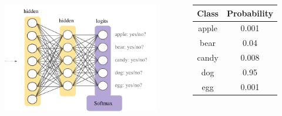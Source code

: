 \begin{frame}
\begin{columns}
		\begin{figure}[!htbp]
			\centering
			\includegraphics[width=1.0\linewidth]{images/supervised/z_algorithms_neural_networks/SoftmaxLayer.pdf}
		\end{figure}

		\begin{scriptsize}
			\begin{table}[]
				\begin{tabular}{|c|c|}
				\hline
				\rowcolor{gray!50} \textbf{Class} & \textbf{Probability}\\ \hline
				apple & 0.001\\ \hline
				bear & 0.04\\ \hline
				candy & 0.008\\ \hline
				dog & 0.95\\ \hline
				egg & 0.001\\ \hline
				\end{tabular}
			\end{table}
		\end{scriptsize}

	\end{columns}

\end{frame}


